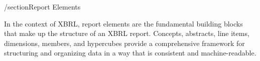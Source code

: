 /section{Report Elements}

In the context of XBRL, report elements are the fundamental building blocks that make up the structure of an XBRL report. 
Concepts, abstracts, line items, dimensions, members, and hypercubes provide a comprehensive framework for structuring and organizing data in a way that is consistent and machine-readable.